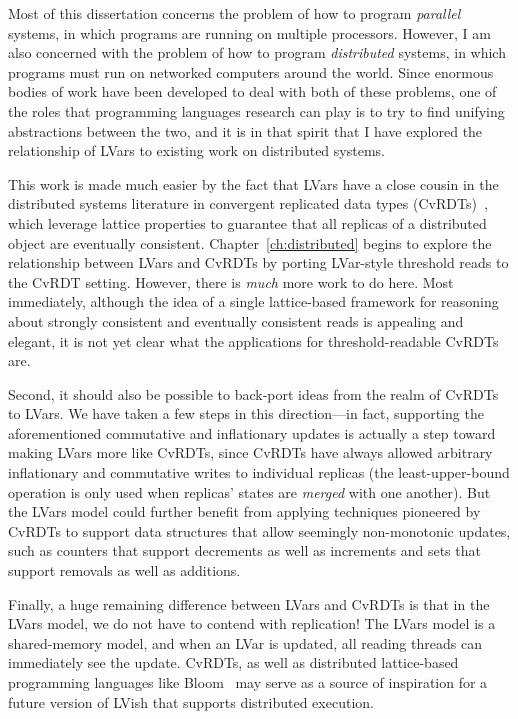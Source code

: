 Most of this dissertation concerns the problem of how to program
\emph{parallel} systems, in which programs are running on multiple
processors.  However, I am also concerned with the problem of how to
program \emph{distributed} systems, in which programs must run on
networked computers around the world.  Since enormous bodies of work
have been developed to deal with both of these problems, one of the
roles that programming languages research can play is to try to find
unifying abstractions between the two, and it is in that spirit that I
have explored the relationship of LVars to existing work on
distributed systems.

This work is made much easier by the fact that LVars have a close
cousin in the distributed systems literature in convergent replicated
data types (CvRDTs)~\cite{crdts,crdts-tr}, which leverage lattice
properties to guarantee that all replicas of a distributed object are
eventually consistent.  Chapter~\ref{ch:distributed} begins to explore
the relationship between LVars and CvRDTs by porting LVar-style
threshold reads to the CvRDT setting.  However, there is \emph{much}
more work to do here.  Most immediately, although the idea of a single
lattice-based framework for reasoning about strongly consistent and
eventually consistent reads is appealing and elegant, it is not yet
clear what the applications for threshold-readable CvRDTs are.

Second, it should also be possible to back-port ideas from the realm
of CvRDTs to LVars.  We have taken a few steps in this direction---in
fact, supporting the aforementioned commutative and inflationary
updates is actually a step toward making LVars more like CvRDTs, since
CvRDTs have always allowed arbitrary inflationary and commutative
writes to individual replicas (the least-upper-bound operation is only
used when replicas' states are \emph{merged} with one another).  But
the LVars model could further benefit from applying techniques
pioneered by CvRDTs to support data structures that allow seemingly
non-monotonic updates, such as counters that support decrements as
well as increments and sets that support removals as well as
additions.

Finally, a huge remaining difference between LVars and CvRDTs is that
in the LVars model, we do not have to contend with replication!  The
LVars model is a shared-memory model, and when an LVar is updated, all
reading threads can immediately see the update.  CvRDTs, as well as
distributed lattice-based programming languages like
Bloom~\cite{bloom-cidr, blooml} may serve as a source of inspiration
for a future version of LVish that supports distributed execution.

